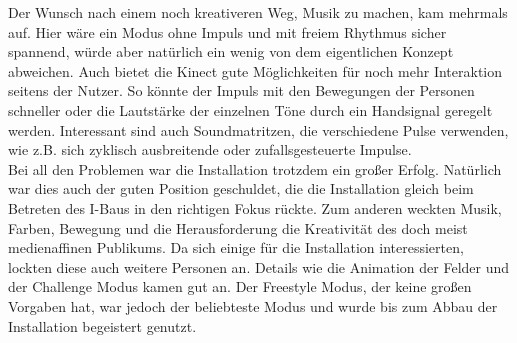 Der Wunsch nach einem noch kreativeren Weg, Musik zu machen, kam mehrmals auf. Hier wäre ein Modus ohne Impuls und mit freiem Rhythmus sicher spannend, würde aber natürlich ein wenig von dem eigentlichen Konzept abweichen. Auch bietet die Kinect gute Möglichkeiten für noch mehr Interaktion seitens der Nutzer. So könnte der Impuls mit den Bewegungen der Personen schneller oder die Lautstärke der einzelnen Töne durch ein Handsignal geregelt werden. Interessant sind auch Soundmatritzen, die verschiedene Pulse verwenden, wie z.B. sich zyklisch ausbreitende oder zufallsgesteuerte Impulse.\\
Bei all den Problemen war die Installation trotzdem ein großer Erfolg. Natürlich war dies auch der guten Position geschuldet, die die Installation gleich beim Betreten des I-Baus in den richtigen Fokus rückte. Zum anderen weckten Musik, Farben, Bewegung und die Herausforderung die Kreativität des doch meist medienaffinen Publikums. Da sich einige für die Installation interessierten, lockten diese auch weitere Personen an. Details wie die Animation der Felder und der Challenge Modus kamen gut an. Der Freestyle Modus, der keine großen Vorgaben hat, war jedoch der beliebteste Modus und wurde bis zum Abbau der Installation begeistert genutzt.